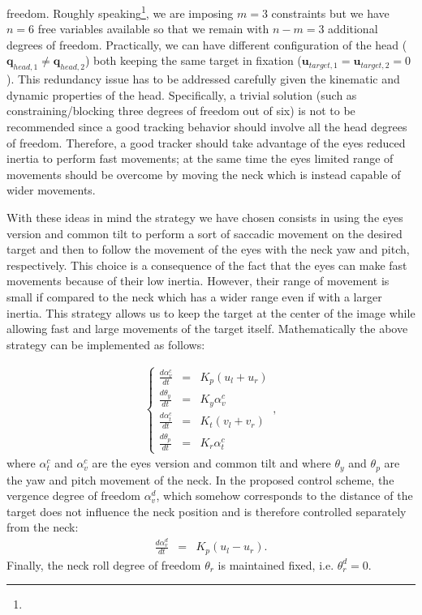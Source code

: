 freedom. Roughly speaking\footnote{}, we are imposing 
$m=3$ constraints but we have $n=6$ free variables available so that we 
remain with $n-m=3$ additional degrees of freedom. Practically, we can have 
different configuration of the head ($\mathbf q_{head,1} \neq \mathbf 
q_{head,2}$) both keeping the same target in fixation 
(${\mathbf u}_{target,1} = {\mathbf u}_{target,2} = 0$). This 
redundancy issue has to be addressed carefully given the kinematic and 
dynamic properties of the head. Specifically, a trivial solution (such 
as constraining/blocking three degrees of freedom out of six) is not to be 
recommended since a good tracking behavior should involve all the  head 
degrees of freedom. Therefore, a good tracker should take advantage of 
the eyes reduced inertia to perform fast movements; at the same time the 
eyes limited range of movements should be overcome by moving the neck which 
is instead capable of wider movements.

With these ideas in mind the strategy we have chosen consists in using the 
eyes version and common tilt to perform a sort of saccadic movement on the 
desired target and then to follow the movement of the eyes with the neck 
yaw and pitch, respectively. This choice is a consequence of the fact that 
the eyes can make fast movements because of their low inertia. However, 
their range of movement is small if compared to the neck which has a wider 
range even if with a larger inertia. This strategy allows us to keep the 
target at the center of the image while allowing fast and large movements 
of the target itself. Mathematically the above strategy can be implemented 
as follows:

\begin{eqnarray} \label{Eq:HeadEyeControl}
\left\{ \begin{matrix}
\frac{d \alpha_v^c}{ d t} &=&   K_p (u_l + u_r)\\
\frac{d \theta_y}{ d t} &=&   K_y \alpha_v^c \\
\frac{d \alpha_t^c} {d t} &=&   K_t (v_l + v_r)\\
\frac{d \theta_p} {d t} &=&   K_r \alpha_t^c
\end{matrix} \right.,
\end{eqnarray}
where $\alpha_t^c$ and $\alpha_v^c$ are the eyes version and common tilt and 
where $\theta_y$ and $\theta_p$ are the yaw and pitch movement of the neck. 
In the proposed control scheme, the vergence degree of freedom $\alpha_v^d$, 
which somehow corresponds to the distance of the target does not influence 
the neck position and is therefore controlled separately from the neck:
\begin{eqnarray} 
\frac{d \alpha_v^d}{ d t} &=&   K_p (u_l - u_r).
\end{eqnarray}
Finally, the neck roll degree of freedom $\theta_r$ is maintained fixed, 
i.e. $\theta_r^d=0$.

